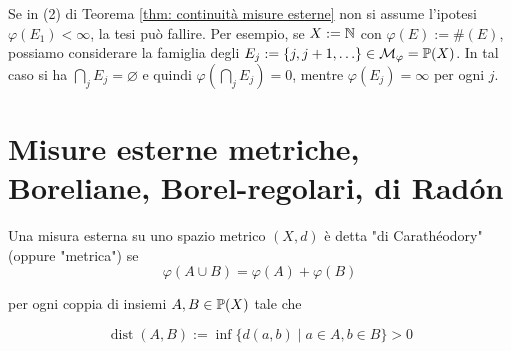 \begin{remark} Se in (2) di Teorema \ref{thm: continuità misure esterne} non si assume l'ipotesi $\varphi\left(E_{1}\right)<\infty$, la tesi può fallire. Per esempio, se $X:=\N$ con $\varphi(E):=\#(E)$, possiamo considerare la famiglia degli $E_{j}:=\{j, j+1, \ldots\} \in \mc{M}_{\varphi}=\P(X)$. In tal caso si ha $\bigcap_{j} E_{j}=\varnothing$ e quindi $\varphi\left(\bigcap_{j} E_{j}\right)=0$, mentre $\varphi\left(E_{j}\right)=\infty$ per ogni $j$.
\end{remark}

\section{Misure esterne metriche, Boreliane, Borel-regolari, di Radón}
\begin{definition}
  Una misura esterna su uno spazio metrico $(X, d)$ è detta "di Carathéodory" (oppure "metrica") se
  \[
  \varphi(A \cup B)=\varphi(A)+\varphi(B)
  \]
  
  per ogni coppia di insiemi $A, B \in \P(X)$ tale che
  
  \[
  \operatorname{dist}(A, B):=\inf \{d(a, b) \mid a \in A, b \in B\}>0
  \]
\end{definition}


